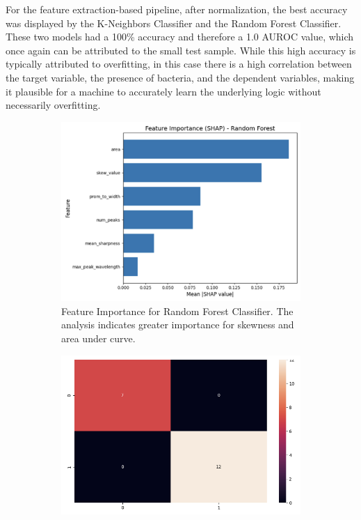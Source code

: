 \noindent For the feature extraction-based pipeline, after normalization, the best accuracy was displayed by the K-Neighbors Classifier and the Random Forest Classifier. These two models had a 100\% accuracy and therefore a 1.0 AUROC value, which once again can be attributed to the small test sample. While this high accuracy is typically attributed to overfitting, in this case there is a high correlation between the target variable, the presence of bacteria, and the dependent variables, making it plausible for a machine to accurately learn the underlying logic without necessarily overfitting. 

\begin{figure}[htbp]
    \centering
    \begin{subfigure}[b]{0.48\textwidth}
        \centering
        \includegraphics[width=\linewidth]{Figures/shap.png}
        \caption{Feature Importance for Random Forest Classifier. The analysis indicates greater importance for skewness and area under curve.}
        \label{fig:shap}
    \end{subfigure}
    \hfill
    \begin{subfigure}[b]{0.48\textwidth}
        \centering
        \includegraphics[width=\linewidth]{Figures/conf_matrix_rand forst.png}

\end{subfigure}
\end{figure}
